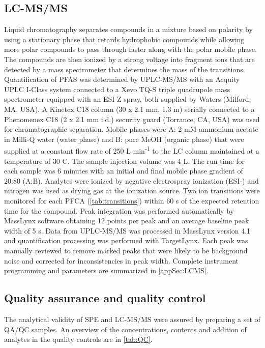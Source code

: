 \subsection{LC-MS/MS}
Liquid chromatography separates compounds in a mixture based on polarity by using a stationary phase that retards hydrophobic compounds while allowing more polar compounds to pass through faster along with the polar mobile phase. The compounds are then ionized by a strong voltage into fragment ions that are detected by a mass spectrometer that determines the mass of the transitions. Quantification of PFAS was determined by UPLC-MS/MS with an Acquity UPLC I-Class system connected to a Xevo TQ-S triple quadrupole mass spectrometer equipped with an ESI Z spray, both supplied by Waters (Milford, MA, USA). A Kinetex C18 column (30 x 2.1 mm, 1.3 \textmu m) serially connected to a Phenomenex C18 (2 x 2.1 mm i.d.) security guard (Torrance, CA, USA) was used for chromatographic separation. Mobile phases were A: 2 mM ammonium acetate in Milli-Q water (water phase) and B: pure MeOH (organic phase) that were supplied at a constant flow rate of 250 \textmu L min\textsuperscript{-1} to the LC column maintained at a temperature of 30 \textdegree C. The sample injection volume was 4 \textmu L. The run time for each sample was 6 minutes with an initial and final mobile phase gradient of 20:80 (A:B). Analytes were ionized by negative electrospray ionization (ESI-) and nitrogen was used as drying gas at the ionization source. Two ion transitions were monitored for each PFCA (\cref{tab:transitions}) within 60 s of the expected retention time for the compound. Peak integration was performed automatically by MassLynx software obtaining 12 points per peak and an average baseline peak width of 5 s. Data from UPLC-MS/MS was processed in MassLynx version 4.1 and quantification processing was performed with TargetLynx. Each peak was manually reviewed to remove marked peaks that were likely to be background noise and corrected for inconsistencies in peak width. Complete instrument programming and parameters are summarized in \cref{appSec:LCMS}.



\subsection{Quality assurance and quality control}
The analytical validity of SPE and LC-MS/MS were assured by preparing a set of QA/QC samples. An overview of the concentrations, contents and addition of analytes in the quality controls are in \cref{tab:QC}.

